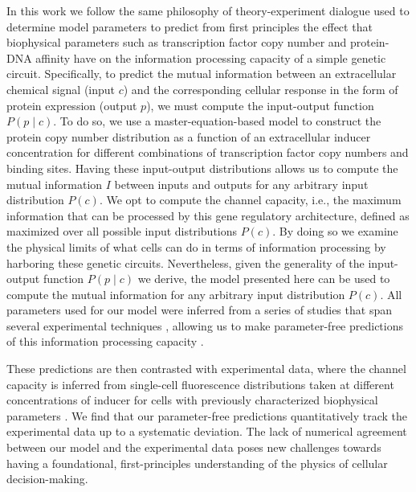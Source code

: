 In this work we follow the same philosophy of theory-experiment dialogue used
to determine model parameters to predict from first principles the effect that
biophysical parameters such as transcription factor copy number and protein-DNA
affinity have on the information processing capacity of a simple genetic
circuit. Specifically, to predict the mutual information between an
extracellular chemical signal (input $c$) and the corresponding cellular
response in the form of protein expression (output $p$), we must compute the
input-output function $P(p \mid c)$. To do so, we use a master-equation-based
model to construct the protein copy number distribution as a function of an
extracellular inducer concentration for different combinations of transcription
factor copy numbers and binding sites. Having these input-output distributions
allows us to compute the mutual information $I$ between inputs and outputs for
any arbitrary input distribution $P(c)$. We opt to compute the channel capacity,
i.e., the maximum information that can be processed by this gene regulatory
architecture, defined as  maximized over all possible input
distributions $P(c)$. By doing so we examine the physical limits of what cells
can do in terms of information processing by harboring these genetic circuits.
Nevertheless, given the generality of the input-output function $P(p \mid c)$ we
derive, the model presented here can be used to compute the mutual information
for any arbitrary input distribution $P(c)$. All parameters used for our model
were inferred from a series of studies that span several experimental techniques
\cite{Garcia2011c, Jones2014a, Brewster2014, Razo-Mejia2018}, allowing us to
make parameter-free predictions of this information processing capacity
\cite{Phillips2019}.

These predictions are then contrasted with experimental data, where the channel
capacity is inferred from single-cell fluorescence distributions taken at
different concentrations of inducer for cells with previously characterized
biophysical parameters \cite{Garcia2011c, Razo-Mejia2018}. We find that our
parameter-free predictions quantitatively track the experimental data up to a
systematic deviation. The lack of numerical agreement between our model and the
experimental data poses new challenges towards having a foundational,
first-principles understanding of the physics of cellular decision-making.

